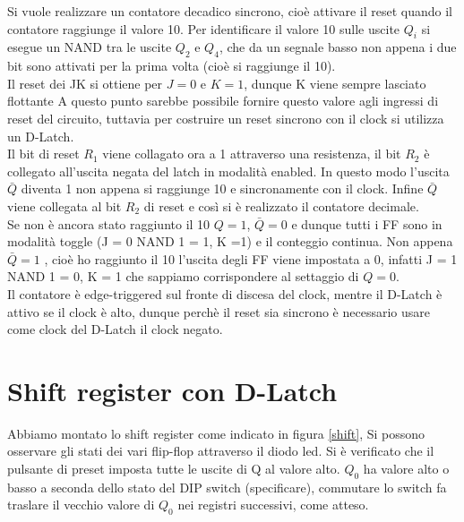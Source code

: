 \documentclass[10pt,a4paper]{article}
\begin{document}
Si vuole realizzare un contatore decadico sincrono, cioè attivare il reset quando il contatore raggiunge il valore 10. Per identificare il valore 10 sulle uscite $Q_i$ si esegue un NAND tra le uscite $Q_2$ e $Q_4$, che da un segnale basso non appena i due bit sono attivati per la prima volta (cioè si raggiunge il 10). \\
Il reset dei JK si ottiene per $J = 0$ e $K = 1$, dunque K viene sempre lasciato flottante
A questo punto sarebbe possibile fornire questo valore agli ingressi di reset del circuito, tuttavia per costruire un reset sincrono con il clock si utilizza un D-Latch.\\
Il bit di reset $R_1$ viene collagato ora a 1 attraverso una resistenza, il bit $R_2$ è collegato all'uscita negata del latch in modalità enabled. In questo modo l'uscita $\bar{Q}$ diventa 1 non appena si raggiunge 10 e sincronamente con il clock. Infine $\bar{Q}$ viene collegata al bit $R_2$ di reset e così si è realizzato il contatore decimale.\\
Se non è ancora stato raggiunto il 10 $Q = 1$, $\bar{Q} = 0$ e dunque tutti i FF sono in modalità toggle (J = 0 NAND 1 = 1, K =1) e il conteggio continua. Non appena $\bar{Q} = 1$ , cioè ho raggiunto il 10 l'uscita degli FF viene impostata a 0, infatti J = 1 NAND 1 = 0, K = 1 che sappiamo corrispondere al settaggio di $Q = 0$.\\
Il contatore è edge-triggered sul fronte di discesa del clock, mentre il D-Latch è attivo se il clock è alto, dunque perchè il reset sia sincrono è necessario usare come clock del D-Latch il clock negato.\\


\section{Shift register con D-Latch}
Abbiamo montato lo shift register come indicato in figura \ref{shift}, Si possono osservare gli stati dei vari flip-flop attraverso il diodo led. Si è verificato che il pulsante di preset imposta tutte le uscite di Q al valore alto. $Q_0$ ha valore alto o basso a seconda dello stato del DIP switch (specificare), commutare lo switch fa traslare il vecchio valore di $Q_0$ nei registri successivi, come atteso.
\end{document}
